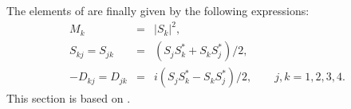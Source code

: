The elements of  are finally given by the following
expressions:
\begin{eqnarray}
  M_k &=& |S_k|^2, \\
  S_{kj} = S_{jk} &=& (S_jS_k^\ast+S_kS_j^\ast)/2, \\
  -D_{kj} = D_{jk} &=& i(S_jS_k^\ast-S_kS_j^\ast)/2, \qquad j,k= 1, 2, 3, 4.
\end{eqnarray}
This section is based on \citet[Sec.\ 5.4.3]{liou:02}.


